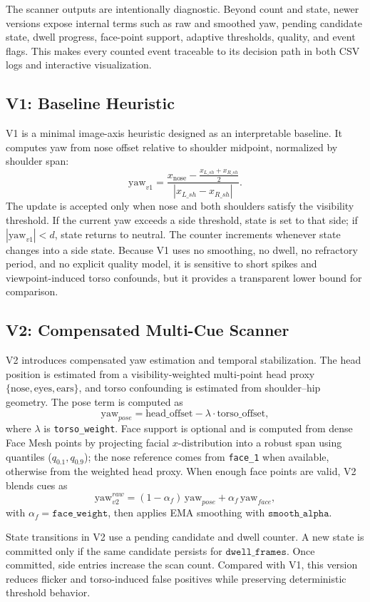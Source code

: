 \documentclass[11pt,a4paper]{article}
\begin{document}
The scanner outputs are intentionally diagnostic. Beyond count and state, newer versions expose internal terms such as raw and smoothed yaw, pending candidate state, dwell progress, face-point support, adaptive thresholds, quality, and event flags. This makes every counted event traceable to its decision path in both CSV logs and interactive visualization.

\subsection{V1: Baseline Heuristic}
V1 is a minimal image-axis heuristic designed as an interpretable baseline. It computes yaw from nose offset relative to shoulder midpoint, normalized by shoulder span:
\[
\text{yaw}_{v1} =
\frac{x_{\text{nose}} - \frac{x_{L\_sh}+x_{R\_sh}}{2}}
{|x_{L\_sh}-x_{R\_sh}|}.
\]
The update is accepted only when nose and both shoulders satisfy the visibility threshold. If the current yaw exceeds a side threshold, state is set to that side; if \(|\text{yaw}_{v1}|<d\), state returns to neutral. The counter increments whenever state changes into a side state. Because V1 uses no smoothing, no dwell, no refractory period, and no explicit quality model, it is sensitive to short spikes and viewpoint-induced torso confounds, but it provides a transparent lower bound for comparison.

\subsection{V2: Compensated Multi-Cue Scanner}
V2 introduces compensated yaw estimation and temporal stabilization. The head position is estimated from a visibility-weighted multi-point head proxy \(\{\text{nose},\text{eyes},\text{ears}\}\), and torso confounding is estimated from shoulder--hip geometry. The pose term is computed as
\[
\text{yaw}_{pose}=\text{head\_offset}-\lambda\cdot\text{torso\_offset},
\]
where \(\lambda\) is \texttt{torso\_weight}. Face support is optional and is computed from dense Face Mesh points by projecting facial \(x\)-distribution into a robust span using quantiles (\(q_{0.1},q_{0.9}\)); the nose reference comes from \texttt{face\_1} when available, otherwise from the weighted head proxy. When enough face points are valid, V2 blends cues as
\[
\text{yaw}_{v2}^{raw}=(1-\alpha_f)\,\text{yaw}_{pose}+\alpha_f\,\text{yaw}_{face},
\]
with \(\alpha_f=\texttt{face\_weight}\), then applies EMA smoothing with \(\texttt{smooth\_alpha}\).

State transitions in V2 use a pending candidate and dwell counter. A new state is committed only if the same candidate persists for \(\texttt{dwell\_frames}\). Once committed, side entries increase the scan count. Compared with V1, this version reduces flicker and torso-induced false positives while preserving deterministic threshold behavior.
\end{document}
